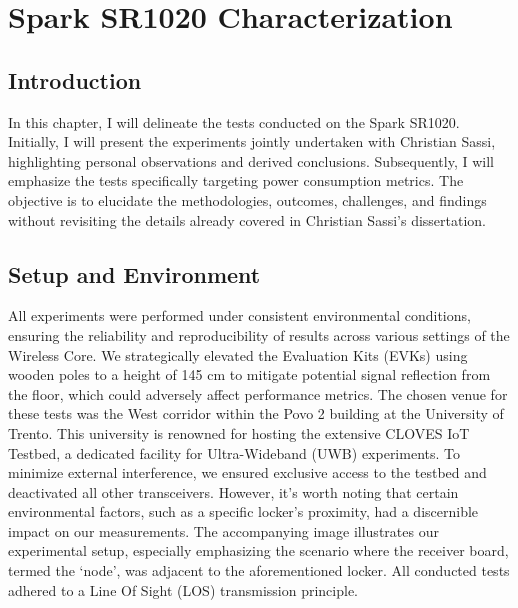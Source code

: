 \chapter{Spark SR1020 Characterization}
\label{cha:characterization}

\section{Introduction}
In this chapter, I will delineate the tests conducted on the Spark SR1020. Initially, I will present the experiments jointly undertaken with Christian Sassi, highlighting personal observations and derived conclusions. Subsequently, I will emphasize the tests specifically targeting power consumption metrics. The objective is to elucidate the methodologies, outcomes, challenges, and findings without revisiting the details already covered in Christian Sassi's dissertation.

\section{Setup and Environment}
All experiments were performed under consistent environmental conditions, ensuring the reliability and reproducibility of results across various settings of the Wireless Core. We strategically elevated the Evaluation Kits (EVKs) using wooden poles to a height of 145 cm to mitigate potential signal reflection from the floor, which could adversely affect performance metrics. The chosen venue for these tests was the West corridor within the Povo 2 building at the University of Trento. This university is renowned for hosting the extensive CLOVES IoT Testbed, a dedicated facility for Ultra-Wideband (UWB) experiments\cite{CLOVES_website}. To minimize external interference, we ensured exclusive access to the testbed and deactivated all other transceivers. However, it's worth noting that certain environmental factors, such as a specific locker's proximity, had a discernible impact on our measurements. The accompanying image illustrates our experimental setup, especially emphasizing the scenario where the receiver board, termed the ‘node’, was adjacent to the aforementioned locker. All conducted tests adhered to a Line Of Sight (LOS) transmission principle.

